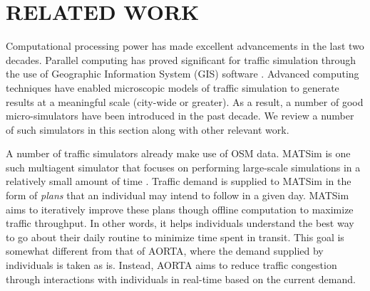 \documentclass[letterpaper, 10 pt, conference]{ieeeconf}  %
\begin{document}



\section{RELATED WORK}
\label{sec:related_work}


Computational processing power has made excellent advancements in the
last two decades. Parallel computing has proved significant for
traffic simulation through the use of Geographic Information System
(GIS) software \cite{pursula1999simulation}. Advanced computing
techniques have enabled microscopic models of traffic simulation to
generate results at a meaningful scale (city-wide or greater). As a
result, a number of good micro-simulators have been introduced in the
past decade. We review a number of such simulators in this section
along with other relevant work.

A number of traffic simulators already make use of OSM data. MATSim is one such
multiagent simulator that focuses on performing large-scale simulations in a
relatively small amount of time \cite{balmer2009matsim}. Traffic demand is
supplied to MATSim in the form of \textit{plans} that an individual may intend
to follow in a given day. MATSim aims to iteratively improve these plans though
offline computation to maximize traffic throughput. In other words, it helps
individuals understand the best way to go about their daily routine to minimize
time spent in transit. This goal is somewhat different from that of AORTA,
where the demand supplied by individuals is taken as is. Instead, AORTA aims to
reduce traffic congestion through interactions with individuals in real-time
based on the current demand.

\end{document}
